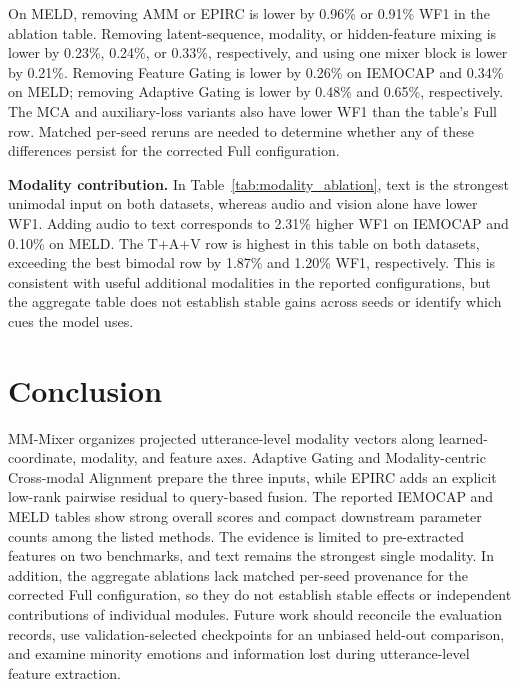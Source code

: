 \documentclass[letterpaper]{article} %
\begin{document}
On MELD, removing AMM or EPIRC is lower by 0.96\% or 0.91\% WF1 in the ablation table. Removing latent-sequence, modality, or hidden-feature mixing is lower by 0.23\%, 0.24\%, or 0.33\%, respectively, and using one mixer block is lower by 0.21\%. Removing Feature Gating is lower by 0.26\% on IEMOCAP and 0.34\% on MELD; removing Adaptive Gating is lower by 0.48\% and 0.65\%, respectively. The MCA and auxiliary-loss variants also have lower WF1 than the table's Full row. Matched per-seed reruns are needed to determine whether any of these differences persist for the corrected Full configuration.

\noindent\textbf{Modality contribution.}
In Table~\ref{tab:modality_ablation}, text is the strongest unimodal input on both datasets, whereas audio and vision alone have lower WF1. Adding audio to text corresponds to 2.31\% higher WF1 on IEMOCAP and 0.10\% on MELD. The T+A+V row is highest in this table on both datasets, exceeding the best bimodal row by 1.87\% and 1.20\% WF1, respectively. This is consistent with useful additional modalities in the reported configurations, but the aggregate table does not establish stable gains across seeds or identify which cues the model uses.

\section{Conclusion}

MM-Mixer organizes projected utterance-level modality vectors along learned-coordinate, modality, and feature axes. Adaptive Gating and Modality-centric Cross-modal Alignment prepare the three inputs, while EPIRC adds an explicit low-rank pairwise residual to query-based fusion. The reported IEMOCAP and MELD tables show strong overall scores and compact downstream parameter counts among the listed methods. The evidence is limited to pre-extracted features on two benchmarks, and text remains the strongest single modality. In addition, the aggregate ablations lack matched per-seed provenance for the corrected Full configuration, so they do not establish stable effects or independent contributions of individual modules. Future work should reconcile the evaluation records, use validation-selected checkpoints for an unbiased held-out comparison, and examine minority emotions and information lost during utterance-level feature extraction.


\end{document}
